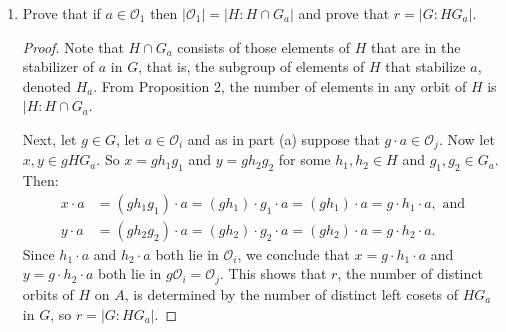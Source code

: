 \documentclass{article}
\begin{document}
\begin{enumerate}[itemsep=0em, label=(\alph*)]
\begin{proof}
            Thus for each $g \in G$ and each $i \in \{ 1, ..., r \}$ there is a $j$ such that $g\mathcal{O}_i = \mathcal{O}_j$. This further implies that all orbits of a normal subgroup have the same cardinality, since $g\mathcal{O}_i = \mathcal{O}_j$ implies that $|\mathcal{O}_i| = |\mathcal{O}_j|$.
        \end{proof}
    \item Prove that if $a \in \mathcal{O}_1$ then $|\mathcal{O}_1| = |H:H \cap G_a|$ and prove that \newline $r = |G:HG_a|$.
        \begin{proof}
            Note that $H \cap G_a$ consists of those elements of $H$ that are in the stabilizer of $a$ in $G$, that is, the subgroup of elements of $H$ that stabilize $a$, denoted $H_a$. From Proposition 2, the number of elements in any orbit of $H$ is $|H:H \cap G_a$.

            Next, let $g \in G$, let $a \in \mathcal{O}_i$ and as in part (a) suppose that $g \cdot a \in \mathcal{O}_j$. Now let $x, y \in gHG_a$. So $x = gh_1g_1$ and $y = gh_2g_2$ for some $h_1, h_2 \in H$ and $g_1, g_2 \in G_a$. Then:
            \begin{align*}
                x \cdot a &= (gh_1g_1) \cdot a = (gh_1) \cdot g_1 \cdot a = (gh_1) \cdot a = g \cdot h_1 \cdot a, \text{ and} \\
                y \cdot a &= (gh_2g_2) \cdot a = (gh_2) \cdot g_2 \cdot a = (gh_2) \cdot a = g \cdot h_2 \cdot a.
            \end{align*}
            Since $h_1 \cdot a$ and $h_2 \cdot a$ both lie in $\mathcal{O}_i$, we conclude that $x = g \cdot h_1 \cdot a$ and $y = g \cdot h_2 \cdot a$ both lie in $g\mathcal{O}_i = \mathcal{O}_j$. This shows that $r$, the number of distinct orbits of $H$ on $A$, is determined by the number of distinct left cosets of $HG_a$ in $G$, so $r = |G:HG_a|$.
        \end{proof}
\end{enumerate}
\end{document}
